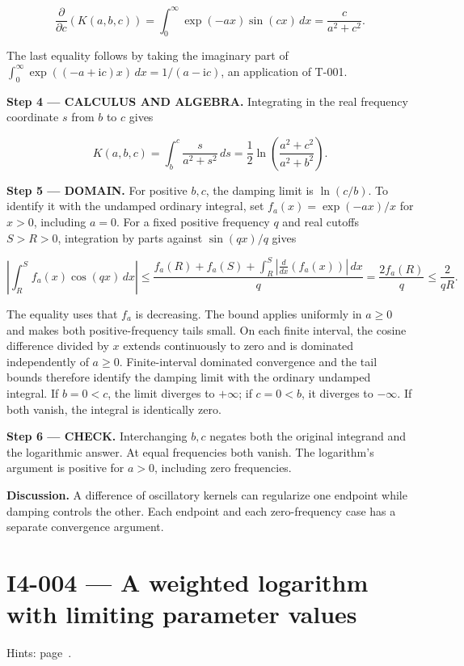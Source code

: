 \documentclass[11pt,oneside,openany]{book}
\begin{document}
\[
\frac{\partial}{\partial c}\left(K(a,b,c)\right)
=\int_0^\infty\exp(-ax)\sin(cx)\,dx=\frac{c}{a^2+c^2}.
\]

The last equality follows by taking the imaginary part of \(\int_0^\infty\exp((-a+\mathrm{i}c)x)\,dx=1/(a-\mathrm{i}c)\), an application of T-001.

\textbf{Step 4 --- CALCULUS AND ALGEBRA.} Integrating in the real frequency coordinate \(s\) from \(b\) to \(c\) gives

\[
K(a,b,c)=\int_b^c\frac{s}{a^2+s^2}\,ds
=\frac12\ln\left(\frac{a^2+c^2}{a^2+b^2}\right).
\]

\begin{DomainStep}
\textbf{Step 5 --- DOMAIN.} For positive \(b,c\), the damping limit is \(\ln(c/b)\). To identify it with the undamped ordinary integral, set \(f_a(x)=\exp(-ax)/x\) for \(x>0\), including \(a=0\). For a fixed positive frequency \(q\) and real cutoffs \(S>R>0\), integration by parts against \(\sin(qx)/q\) gives

\[
\left|\int_R^S f_a(x)\cos(qx)\,dx\right|
\le\frac{f_a(R)+f_a(S)+\int_R^S\left|\frac{d}{dx}(f_a(x))\right|\,dx}{q}
=\frac{2f_a(R)}{q}\le\frac{2}{qR}.
\]

The equality uses that \(f_a\) is decreasing. The bound applies uniformly in \(a\ge0\) and makes both positive-frequency tails small. On each finite interval, the cosine difference divided by \(x\) extends continuously to zero and is dominated independently of \(a\ge0\). Finite-interval dominated convergence and the tail bounds therefore identify the damping limit with the ordinary undamped integral. If \(b=0<c\), the limit diverges to \(+\infty\); if \(c=0<b\), it diverges to \(-\infty\). If both vanish, the integral is identically zero.

\end{DomainStep}
\textbf{Step 6 --- CHECK.} Interchanging \(b,c\) negates both the original integrand and the logarithmic answer. At equal frequencies both vanish. The logarithm's argument is positive for \(a>0\), including zero frequencies.

\textbf{Discussion.} A difference of oscillatory kernels can regularize one endpoint while damping controls the other. Each endpoint and each zero-frequency case has a separate convergence argument.
\clearpage
\section{I4-004 --- A weighted logarithm with limiting parameter values}
\label{problem:I4-004}
{\small Hints: page~\pageref{hints:I4-004}.}\par\medskip
\end{document}
